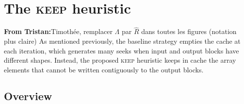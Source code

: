 \documentclass[sigconf, nonacm]{acmart}
\newcommand{\tristan}[1]{\color{orange}\textbf{From Tristan:}#1\color{black}}
\newcommand{\keep}[0]{\textsc{keep}\xspace}
\begin{document}




\section{The \keep heuristic}
\tristan{Timothée, remplacer $\Lambda$ par $\hat R$ dans toutes les figures (notation plus claire)}
As mentioned previously, the baseline strategy empties
the cache at each iteration, which generates many seeks when input and output
blocks have different shapes. Instead, the proposed
\keep heuristic keeps in cache the array elements that cannot be written
contiguously to the output blocks.

\subsection{Overview}
\end{document}
